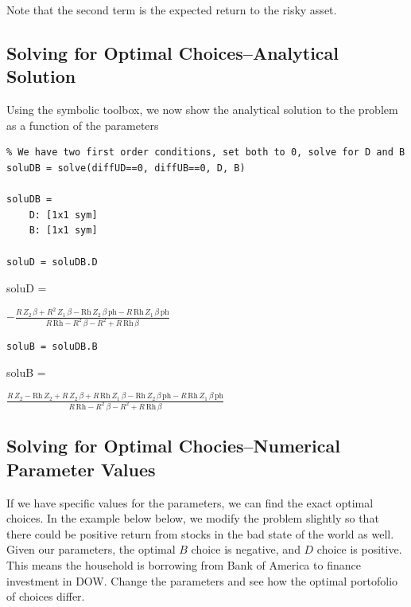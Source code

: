 \documentclass[
]{book}
\begin{document}
Note that the second term is the expected return to the risky asset.

\hypertarget{solving-for-optimal-choicesanalytical-solution}{%
\subsection{Solving for Optimal Choices--Analytical Solution}\label{solving-for-optimal-choicesanalytical-solution}}

Using the symbolic toolbox, we now show the analytical solution to the
problem as a function of the parameters

\begin{verbatim}
% We have two first order conditions, set both to 0, solve for D and B
soluDB = solve(diffUD==0, diffUB==0, D, B)

soluDB = 
    D: [1x1 sym]
    B: [1x1 sym]

soluD = soluDB.D
\end{verbatim}

soluD =

\(\displaystyle -\frac{R\,Z_2 \,\beta +R^2 \,Z_1 \,\beta -\textrm{Rh}\,Z_2 \,\beta \,\textrm{ph}-R\,\textrm{Rh}\,Z_1 \,\beta \,\textrm{ph}}{R\,\textrm{Rh}-R^2 \,\beta -R^2 +R\,\textrm{Rh}\,\beta }\)

\begin{verbatim}
soluB = soluDB.B
\end{verbatim}

soluB =

\(\displaystyle \frac{R\,Z_2 -\textrm{Rh}\,Z_2 +R\,Z_2 \,\beta +R\,\textrm{Rh}\,Z_1 \,\beta -\textrm{Rh}\,Z_2 \,\beta \,\textrm{ph}-R\,\textrm{Rh}\,Z_1 \,\beta \,\textrm{ph}}{R\,\textrm{Rh}-R^2 \,\beta -R^2 +R\,\textrm{Rh}\,\beta }\)

\hypertarget{solving-for-optimal-chociesnumerical-parameter-values}{%
\subsection{Solving for Optimal Chocies--Numerical Parameter Values}\label{solving-for-optimal-chociesnumerical-parameter-values}}

If we have specific values for the parameters, we can find the exact
optimal choices. In the example below below, we modify the problem
slightly so that there could be positive return from stocks in the bad
state of the world as well. Given our parameters, the optimal \(B\) choice
is negative, and \(D\) choice is positive. This means the household is
borrowing from Bank of America to finance investment in DOW. Change the
parameters and see how the optimal portofolio of choices differ.
\end{document}
